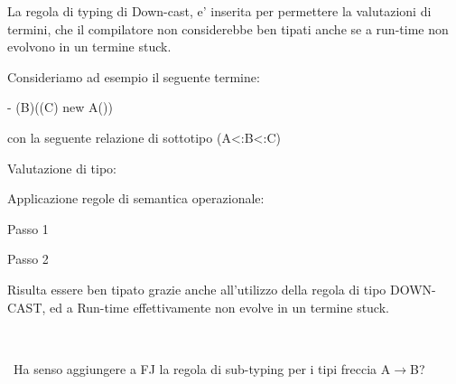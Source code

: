La regola di typing di Down-cast, e' inserita per permettere la valutazioni di termini, che il compilatore non considerebbe ben tipati anche se a run-time non evolvono in un termine stuck.

\vspace{0,5cm}
Consideriamo ad esempio il seguente termine: 

	- (B)((C) new A())
	
	con la seguente relazione di sottotipo (A<:B<:C)

\vspace{0,5cm}	
Valutazione di tipo:

\vspace{0,3cm}
\begin{prooftree}
	\end{prooftree}
	
\vspace{1cm}	
Applicazione regole di semantica operazionale:

\vspace{0,3cm}
Passo 1
\begin{prooftree}
	\end{prooftree}	

\vspace{0,3cm}
Passo 2

	\begin{prooftree}
	\end{prooftree}	

\vspace{0,5cm}
Risulta essere ben tipato grazie anche all'utilizzo della regola di tipo DOWN-CAST, ed a Run-time effettivamente non evolve in un termine stuck.




\vspace{1cm}			 
\subsection*{}\
\\
\
Ha senso aggiungere a FJ la regola di sub-typing per i tipi freccia A$\rightarrow$B?


